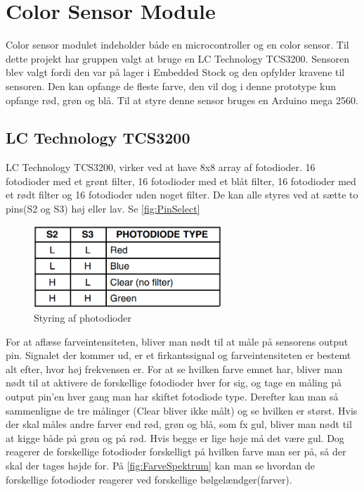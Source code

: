 \graphicspath{{Chapters/Teori/}}


\section{Color Sensor Module}
Color sensor modulet indeholder både en microcontroller og en color sensor. Til dette projekt har gruppen valgt at bruge en LC Technology TCS3200. Sensoren blev valgt fordi den var på lager i Embedded Stock og den opfylder kravene til sensoren. Den kan opfange de fleste farve, den vil dog i denne prototype kun opfange rød, grøn og blå. Til at styre denne sensor bruges en Arduino mega 2560.

\subsection{LC Technology TCS3200}
LC Technology TCS3200, virker ved at have 8x8 array af fotodioder. 16 fotodioder med et grønt filter, 16 fotodioder med et blåt filter, 16 fotodioder med et rødt filter og 16 fotodioder uden noget filter. De kan alle styres ved at sætte to pins(S2 og S3) høj eller lav. \cite{man:TC3200} Se \autoref{fig:PinSelect}

\begin{figure}[H]
	\centering
	\includegraphics[width = 200pt]{Img/S1S2_color.png}
	\caption{Styring af photodioder}
	\label{fig:PinSelect}
\end{figure}

For at aflæse farveintensiteten, bliver man nødt til at måle på sensorens output pin. Signalet der kommer ud, er et firkantssignal og farveintensiteten er bestemt alt efter, hvor høj frekvensen er. For at se hvilken farve emnet har, bliver man nødt til at aktivere de forskellige fotodioder hver for sig, og tage en måling på output pin'en hver gang man har skiftet fotodiode type. Derefter kan man så sammenligne de tre målinger (Clear bliver ikke målt) og se hvilken er størst. Hvis der skal måles andre farver end rød, grøn og blå, som fx gul, bliver man nødt til at kigge både på grøn og på rød. Hvis begge er lige høje må det være gul. Dog reagerer de forskellige fotodioder forskelligt på hvilken farve man ser på, så der skal der tages højde for. På \autoref{fig:FarveSpektrum} kan man se hvordan de forskellige fotodioder reagerer ved forskellige bølgelændger(farver)\cite{man:TC3200}.


